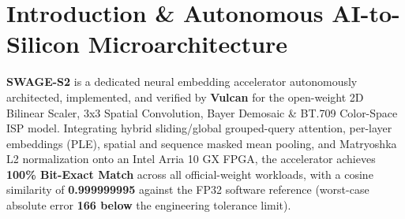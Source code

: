 \documentclass[11pt,a4paper]{article}
\begin{document}
\section{Introduction \& Autonomous AI-to-Silicon Microarchitecture}

\textbf{SWAGE-S2} is a dedicated neural embedding accelerator autonomously architected, implemented, and verified by \textbf{Vulcan} for the open-weight 2D Bilinear Scaler,\allowbreak{} 3x3 Spatial Convolution,\allowbreak{} Bayer Demosaic \& BT.709 Color-Space ISP model. Integrating hybrid sliding/global grouped-query attention, per-layer embeddings (PLE), spatial and sequence masked mean pooling, and Matryoshka L2 normalization onto an Intel Arria 10 GX FPGA, the accelerator achieves \textbf{100\% Bit-Exact Match} across all official-weight workloads, with a cosine similarity of \textbf{0.999999995} against the FP32 software reference (worst-case absolute error \textbf{166\texttimes{} below} the engineering tolerance limit).

\vspace{2pt}
\end{document}
